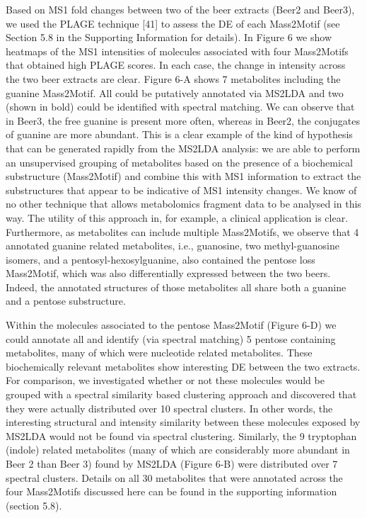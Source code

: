Based on MS1 fold changes between two of the beer extracts (Beer2 and Beer3), we used the PLAGE technique [41] to assess the DE of each Mass2Motif (see Section 5.8 in the Supporting Information for details). In Figure 6 we show heatmaps of the MS1 intensities of molecules associated with four Mass2Motifs that obtained high PLAGE scores. In each case, the change in intensity across the two beer extracts are clear. Figure 6-A shows 7 metabolites including the guanine Mass2Motif. All could be putatively annotated  via MS2LDA and two (shown in bold) could be identified with spectral matching. We can observe that in Beer3, the free guanine is present more often, whereas in Beer2, the conjugates of guanine are more abundant. This is a clear example of the kind of hypothesis that can be generated rapidly from the MS2LDA analysis: we are able to perform an unsupervised grouping of metabolites based on the presence of a biochemical substructure (Mass2Motif) and combine this with MS1 information to extract the substructures that appear to be indicative of MS1 intensity changes. We know of no other technique that allows metabolomics fragment data to be analysed in this way. The utility of this approach in, for example, a clinical application is clear. Furthermore, as metabolites can include multiple Mass2Motifs, we observe that 4 annotated guanine related metabolites, i.e., guanosine, two methyl-guanosine isomers, and a pentosyl-hexosylguanine, also contained the pentose loss Mass2Motif, which was also differentially expressed between the two beers. Indeed, the annotated structures of those metabolites all share both a guanine and a pentose substructure. 

Within the molecules associated to the pentose Mass2Motif (Figure 6-D) we could annotate all and identify (via spectral matching) 5 pentose containing metabolites, many of which were nucleotide related metabolites. These biochemically relevant metabolites show interesting DE between the two extracts. For comparison, we investigated whether or not these molecules would be grouped with a spectral similarity based clustering approach and discovered that they were actually distributed over 10 spectral clusters. In other words, the interesting structural and intensity similarity between these molecules exposed by MS2LDA would not be found via spectral clustering. Similarly, the 9 tryptophan (indole) related metabolites (many of which are considerably more abundant in Beer 2 than Beer 3) found by MS2LDA (Figure 6-B) were distributed over 7 spectral clusters. Details on all 30 metabolites that were annotated across the four Mass2Motifs discussed here can be found in the supporting information (section 5.8).

